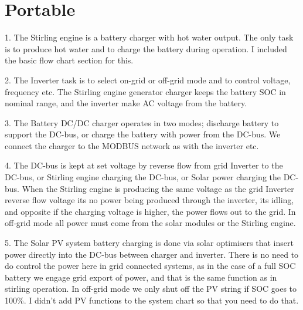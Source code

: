 \section{Portable}
\label{ch:portable}

1.	The Stirling engine is a battery charger with hot water output. The only task is to produce hot water and to charge the battery during operation. I included the basic flow chart section for this. 

2.	The Inverter task is to select on-grid or off-grid mode and to control voltage, frequency etc. The Stirling engine generator charger keeps the battery SOC in nominal range, and the inverter make AC voltage from the battery. 

3.	The Battery DC/DC charger operates in two modes; discharge battery to support the DC-bus, or charge the battery with power from the DC-bus. We connect the charger to the MODBUS network as with the inverter etc. 

4.	The DC-bus is kept at set voltage by reverse flow from grid Inverter to the DC-bus, or Stirling engine charging the DC-bus, or Solar power charging the DC-bus. When the Stirling engine is producing the same voltage as the grid Inverter reverse flow voltage its no power being produced through the inverter, its idling, and opposite if the charging voltage is higher, the power flows out to the grid. In off-grid mode all power must come from the solar modules or the Stirling engine. 

5.	The Solar PV system battery charging is done via solar optimisers that insert power directly into the DC-bus between charger and inverter. There is no need to do control the power here in grid connected systems, as in the case of a full SOC battery we engage grid export of power, and that is the same function as in stirling operation. In off-grid mode we only shut off the PV string if SOC goes to 100\%. I didn’t add PV functions to the system chart so that you need to do that.

\newpage
\begin{figure}

\vspace*{6in}
\label{fig: Operation flow in portable system.}
\end{figure}
\newpage

\clearpage
\newpage
\begin{figure}
	
\vspace*{7in}
\label{fig: Key Switch Off sequence in portable.}	
\end{figure}

